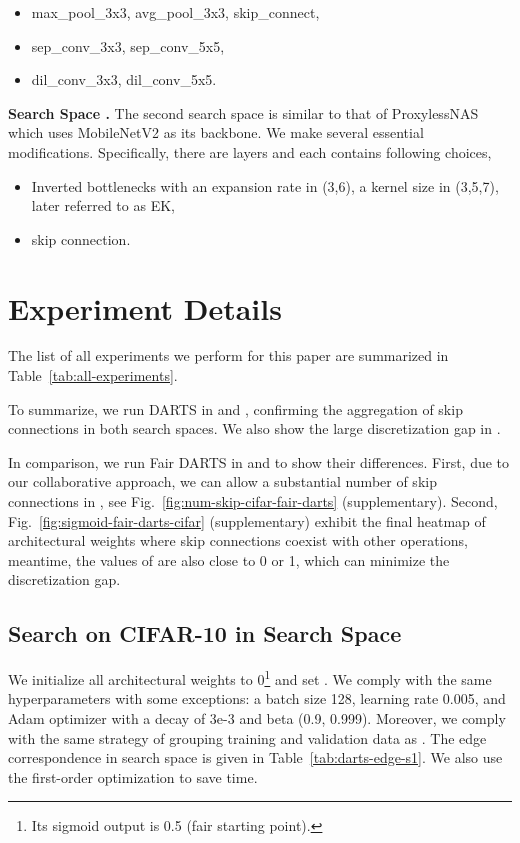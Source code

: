 \documentclass[runningheads]{llncs}
\begin{document}
\begin{itemize}
	\item max\_pool\_3x3, avg\_pool\_3x3, skip\_connect,
	\item sep\_conv\_3x3, sep\_conv\_5x5,
	\item dil\_conv\_3x3, dil\_conv\_5x5.
\end{itemize}

\textbf{Search Space .} The second search space  is similar to that of ProxylessNAS  \cite{cai2018proxylessnas} which uses MobileNetV2 \cite{sandler2018mobilenetv2} as its backbone. We make several essential modifications. Specifically, there are  layers and each contains  following choices,

\begin{itemize}
	\item Inverted bottlenecks with an expansion rate  in (3,6), a kernel size  in (3,5,7), later referred to as EK, \item skip connection.
\end{itemize}

\section{Experiment Details}

The list of all experiments we perform for this paper are summarized in Table~\ref{tab:all-experiments}. 

To summarize, we run DARTS \cite{liu2018darts} in  and , confirming the aggregation of skip connections in both search spaces. We also show the large discretization gap in .

In comparison, we run Fair DARTS in  and  to show their differences. First, due to our collaborative approach, we can allow a substantial number of skip connections in , see Fig.~\ref{fig:num-skip-cifar-fair-darts} (supplementary). Second, Fig.~\ref{fig:sigmoid-fair-darts-cifar} (supplementary) exhibit the final heatmap of architectural weights  where skip connections coexist with other operations, meantime, the values of   are also close to 0 or 1, which can minimize the discretization gap.

\subsection{Search on CIFAR-10 in Search Space }
We initialize all architectural weights to 0\footnote{Its sigmoid output is 0.5 (fair starting point).} and set  . We comply with the same hyperparameters with some exceptions: a batch size 128, learning rate 0.005, and Adam optimizer with a decay of 3e-3 and beta (0.9, 0.999).  Moreover, we comply with the same strategy of grouping training and validation data as \cite{liu2018darts}. The edge correspondence in search space  is given in Table~\ref{tab:darts-edge-s1}. We also use the first-order optimization to save time. 
\end{document}
